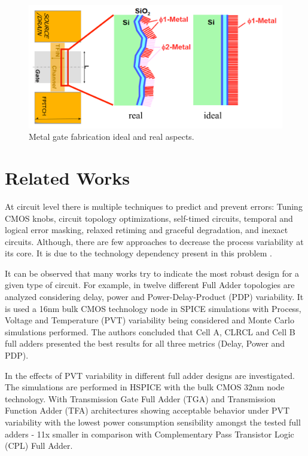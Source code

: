 \documentclass[ecp,tc, english]{iiufrgs}
\begin{document}
\begin{figure}[H]
\centering
\includegraphics[width=\textwidth]{wff.png}
\caption{Metal gate fabrication ideal and real aspects.}
\label{wff}
\end{figure}

\section{Related Works}

At circuit level there is multiple techniques to predict and prevent errors: Tuning CMOS knobs, circuit topology optimizations, self-timed circuits, temporal and logical error masking, relaxed retiming and graceful degradation, and inexact circuits. Although, there are few approaches to decrease the process variability at its core. It is due to the technology dependency present in this problem \cite{rahimi2016variability}.

It can be observed that many works try to indicate the most robust design for a given type of circuit. For example, in \cite{dokania2013investigation} twelve different Full Adder topologies are analyzed considering delay, power and Power-Delay-Product (PDP) variability. It is used a 16nm bulk CMOS technology node in SPICE simulations with Process, Voltage and Temperature (PVT) variability being considered and Monte Carlo simulations performed. The authors concluded that Cell A, CLRCL and Cell B full adders presented the best results for all three metrics (Delay, Power and PDP).

In \cite{ames2016investigating} the effects of PVT variability in different full adder designs are investigated. The simulations are performed in HSPICE with the bulk CMOS 32nm node technology. With Transmission Gate Full Adder (TGA) and Transmission Function Adder (TFA) architectures showing acceptable behavior under PVT variability with the lowest power consumption sensibility amongst the tested full adders - 11x smaller in comparison with Complementary Pass Transistor Logic (CPL) Full Adder.
\end{document}
